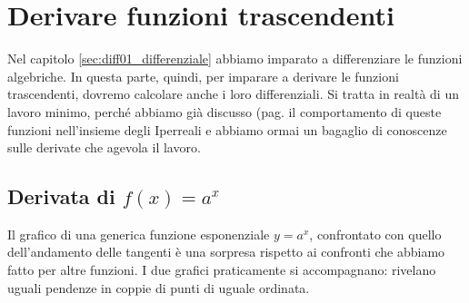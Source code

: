 \section{Derivare funzioni trascendenti}
\label{sec:diff01_deritrasc}
Nel capitolo \ref{sec:diff01_differenziale} abbiamo imparato a differenziare 
le funzioni algebriche. In questa parte, quindi, per imparare
a derivare le funzioni trascendenti, dovremo calcolare anche i loro 
differenziali. Si tratta in realtà di un lavoro minimo, perché abbiamo già
discusso (pag.\pageref{subsubsec:insnum_expstar} il comportamento di queste funzioni
nell'insieme degli Iperreali e abbiamo ormai un bagaglio di conoscenze 
sulle derivate che agevola il lavoro.
\subsection{Derivata di $f(x)=a^x$}
\label{}
Il grafico di una generica funzione esponenziale $y=a^x$, confrontato con quello 
dell'andamento delle tangenti è una sorpresa rispetto ai confronti che abbiamo
fatto per altre funzioni. I due grafici praticamente si accompagnano: 
rivelano uguali pendenze in coppie di punti di uguale ordinata.

